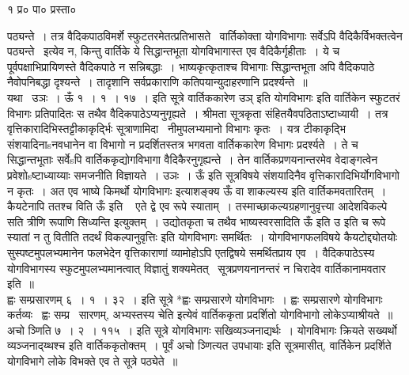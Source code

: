 \documentclass[11pt, openany]{book}
\makeatletter
\newcommand{\devanagarinumeral}[1]{
\devanagaridigits{\number \csname c@#1\endcsname}} %
\makeatother
\begin{document}
१ प्र० पा० प्रस्ता०

\fancyhead[LE,LO,RE,RO]{}
\fancyhead[CE,CO]{\thepage}
\cfoot{}
\newpage
\renewcommand{\thepage}{ ( \devanagarinumeral{page} ) }
\setcounter{page}{2}

\noindent
पठ्यन्ते~। तत्र वैदिकपाठविमर्शे स्फुटतरमेतत्प्रतिभासते \textendash\ वार्तिकोक्ता योगविभागाः सर्वेऽपि वैदिकैर्विभक्तत्वेन पठ्यन्ते \textendash\ इत्येव न, किन्तु वार्तिके ये सिद्धान्तभूता योगविभागास्त एव वैदिकैर्गृहीताः~। ये च पूर्वपक्षाभिप्रायिणस्ते वैदिकपाठे न सन्निबद्धाः~। भाष्यकृत्कृताश्च विभागाः सिद्धान्तभूता अपि वैदिकपाठे नैवोपनिबद्धा दृश्यन्ते~। तादृशानि सर्वप्रकाराणि कतिपयान्युदाहरणानि प्रदर्श्यन्ते~॥\\

यथा \textendash\ उञः~। ऊँ १~। १~। १७~। इति सूत्रे वार्तिककारेण {\qt उञ् इति योगविभागः} इति वार्तिकेन स्फुटतरं विभागः प्रतिपादितः स तथैव वैदिकपाठेऽप्यनुगृह्यते~। श्रीमता सूत्रकृता संहितयैवपठिताऽष्टाध्यायी~। तत्र वृत्तिकारादिभिस्तट्टीकाकृर्द्भिः सूत्राणामिदा \textendash\ नीमुपलभ्यमानो विभागः कृतः~। यत्र टीकाकृद्भि संशयादिनाsनवधानेन वा विभागो न प्रदर्शितस्तत्र भगवता वार्तिककारेण विभागः प्रदर्श्यते~। ते च सिद्धान्तभूताः सर्वेsपि वार्तिककृद्योगविभागा वैदिकैरनुगृह्यन्ते~। तेन वार्तिकप्रणयनान्तरमेव वेदाङ्गत्वेन प्रवेशोsष्टाध्याय्याः समजनीति विज्ञायते~। {\qt उञः~। ऊँ} इति सूत्रविषये संशयादिनैव वृत्तिकारादिभिर्योगविभागो न कृतः~। अत एव भाष्ये {\qt किमर्थो योगविभागः} इत्याशङ्क्य {\qt ऊँ वा शाकल्यस्य} इति वार्तिकमवतारितम्~। कैयटेनापि {\qt ततश्च विति ऊँ इति \textendash\ } एते द्वे एव रूपे स्याताम्~। तस्माच्छाकल्यग्रहणानुवृत्त्या आदेशविकल्पे सति {\qt त्रीणि रूपाणि सिध्यन्ति} इत्युक्तम्~। उद्योतकृता च तथैव भाष्यस्वरसादिति ऊँ इति उ इति च रूपे स्यातां न तु वितीति तदर्थं विकल्पानुवृत्तिः इति योगविभागः समर्थितः~। योगविभागफलविषये कैयटोद्द्योतयोः सुस्पष्टमुपलभ्यमानेन फलभेदेन वृत्तिकाराणां व्यामोहोऽपि एतद्विषये समर्थितप्राय एव~। वैदिकपाठेऽस्य योगविभागस्य स्फुटमुपलभ्यमानत्वात् विज्ञातुं शक्यमेतत् \textendash\ सूत्रप्रणयनानन्तरं न चिरादेव वार्तिकानामवतार इति~॥\\

ह्वः सम्प्रसारणम् ६~। १~। ३२~। इति सूत्रे *{\qt ह्वः सम्प्रसारणे योगविभागः~। ह्वः सम्प्रसारणे योगविभागः कर्तव्यः \textendash\ ह्वः सम्प्र \textendash\ सारणम्, अभ्यस्तस्य चेति} इत्येवं वार्तिककृता प्रदर्शितो योगविभागो लोकेऽप्याश्रीयते~॥\\

अचो ञ्णिति ७~। २~। ११५~। इति सूत्रे {\qt *योगविभागः सखिव्यञ्जनाद्यर्थः~। योगविभागः क्रियते सख्यर्थो व्यञ्जनाद्य्थश्च} इति वार्तिककृतोक्तम्~। पूर्वं {\qt अचो ञ्णित्यत उपधायाः }इति सूत्रमासीत्, वार्तिकेन प्रदर्शिते योगविभागे लोके विभक्ते एव ते सूत्रे पठ्येते~॥\\
\end{document}
